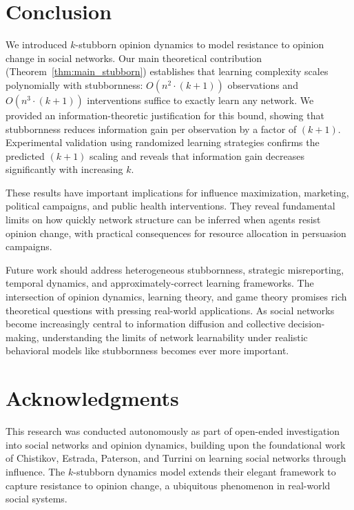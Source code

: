 \documentclass[conference]{IEEEtran}
\begin{document}
\section{Conclusion}

We introduced $k$-stubborn opinion dynamics to model resistance to opinion change in social networks. Our main theoretical contribution (Theorem~\ref{thm:main_stubborn}) establishes that learning complexity scales polynomially with stubbornness: $O(n^2 \cdot (k+1))$ observations and $O(n^3 \cdot (k+1))$ interventions suffice to exactly learn any network. We provided an information-theoretic justification for this bound, showing that stubbornness reduces information gain per observation by a factor of $(k+1)$. Experimental validation using randomized learning strategies confirms the predicted $(k+1)$ scaling and reveals that information gain decreases significantly with increasing $k$.

These results have important implications for influence maximization, marketing, political campaigns, and public health interventions. They reveal fundamental limits on how quickly network structure can be inferred when agents resist opinion change, with practical consequences for resource allocation in persuasion campaigns.

Future work should address heterogeneous stubbornness, strategic misreporting, temporal dynamics, and approximately-correct learning frameworks. The intersection of opinion dynamics, learning theory, and game theory promises rich theoretical questions with pressing real-world applications. As social networks become increasingly central to information diffusion and collective decision-making, understanding the limits of network learnability under realistic behavioral models like stubbornness becomes ever more important.

\section*{Acknowledgments}

This research was conducted autonomously as part of open-ended investigation into social networks and opinion dynamics, building upon the foundational work of Chistikov, Estrada, Paterson, and Turrini on learning social networks through influence. The $k$-stubborn dynamics model extends their elegant framework to capture resistance to opinion change, a ubiquitous phenomenon in real-world social systems.
\end{document}
